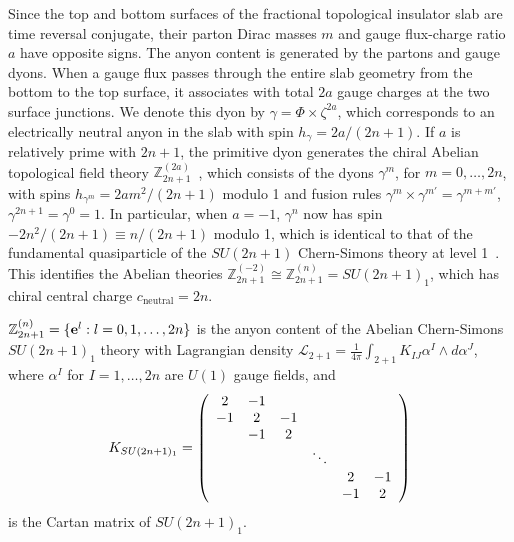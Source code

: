 Since the top and bottom surfaces of the fractional topological insulator slab are time reversal conjugate, their parton Dirac masses $m$ and gauge flux-charge ratio $a$ have opposite signs. The anyon content is generated by the partons and gauge dyons. When a gauge flux passes through the entire slab geometry from the bottom to the top surface, it associates with total $2a$ gauge charges at the two surface junctions. We denote this dyon by $\gamma=\Phi\times\zeta^{2a}$, which corresponds to an electrically neutral anyon in the slab with spin $h_\gamma=2a/(2n+1)$. If $a$ is relatively prime with $2n+1$, the primitive dyon generates the chiral Abelian topological field theory $\mathbb{Z}_{2n+1}^{(2a)}$~\cite{MooreSeiberg89,Bondersonthesis}, which consists of the dyons $\gamma^m$, for $m=0,\ldots,2n$, with spins $h_{\gamma^m}=2am^2/(2n+1)$ modulo 1 and fusion rules $\gamma^m\times\gamma^{m'}=\gamma^{m+m'}$, $\gamma^{2n+1}=\gamma^0=1$. In particular, when $a=-1$, $\gamma^n$ now has spin $-2n^2/(2n+1)\equiv n/(2n+1)$ modulo 1, which is identical to that of the fundamental quasiparticle of the $SU(2n+1)$ Chern-Simons theory at level 1~\cite{MooreSeiberg89,Bondersonthesis}. This identifies the Abelian theories $\mathbb{Z}_{2n+1}^{(-2)}\cong\mathbb{Z}_{2n+1}^{(n)}=SU(2n+1)_1$, which has chiral central charge $c_{\mathrm{neutral}}=2n$.

$\mathbb{Z}^{(n)}_{2n+1}=\{{\bf e}^l:l=0,1,\ldots,2n\}$ is the anyon content of the Abelian Chern-Simons $SU(2n+1)_1$ theory with Lagrangian density $\mathcal{L}_{2+1}=\frac{1}{4\pi}\int_{2+1}K_{IJ}\alpha^I\wedge d\alpha^J$, where $\alpha^I$ for $I=1,\ldots,2n$ are $U(1)$ gauge fields, and \begin{align}K_{SU(2n+1)_1}=\left(\begin{array}{*{20}c}2&-1&&&&\\-1&2&-1&&&\\&-1&2&&&\\&&&\ddots&&\\&&&&2&-1\\&&&&-1&2\end{array}\right)\end{align} is the Cartan matrix of $SU(2n+1)_1$. 

